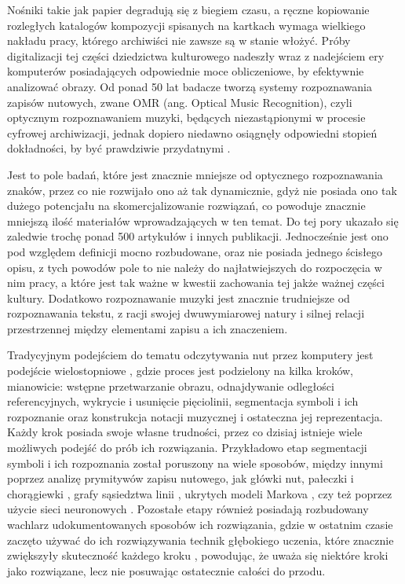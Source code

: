 \documentclass[xodstep]{wnspt}
\begin{document}
Nośniki takie jak papier degradują się z biegiem czasu, a ręczne kopiowanie rozległych katalogów kompozycji spisanych na kartkach wymaga wielkiego nakładu pracy, którego archiwiści nie zawsze są w stanie włożyć. Próby digitalizacji tej części dziedzictwa kulturowego nadeszły wraz z nadejściem ery komputerów posiadających odpowiednie moce obliczeniowe, by efektywnie analizować obrazy. Od ponad 50 lat badacze tworzą systemy rozpoznawania zapisów nutowych, zwane OMR (ang. Optical Music Recognition), czyli optycznym rozpoznawaniem muzyki, będących niezastąpionymi w procesie cyfrowej archiwizacji, jednak dopiero niedawno osiągnęły odpowiedni stopień dokładności, by być prawdziwie przydatnymi \cite{Hajicjr.2018}. 

Jest to pole badań, które jest znacznie mniejsze od optycznego rozpoznawania znaków, przez co nie rozwijało ono aż tak dynamicznie, gdyż nie posiada ono tak dużego potencjału na skomercjalizowanie rozwiązań, co powoduje znacznie mniejszą ilość materiałów wprowadzających w ten temat. Do tej pory ukazało się zaledwie trochę ponad 500 artykułów i innych publikacji. Jednocześnie jest ono pod względem definicji mocno rozbudowane, oraz nie posiada jednego ścisłego opisu, z tych powodów pole to nie należy do najłatwiejszych do rozpoczęcia w nim pracy\cite{Calvo-Zaragoza2020}, a które jest tak ważne w kwestii zachowania tej jakże ważnej części kultury. Dodatkowo rozpoznawanie muzyki jest znacznie trudniejsze od rozpoznawania tekstu, z racji swojej dwuwymiarowej natury i silnej relacji przestrzennej między elementami zapisu a ich znaczeniem.

Tradycyjnym podejściem do tematu odczytywania nut przez komputery jest podejście wielostopniowe \cite{Rebelo2012}, gdzie proces jest podzielony na kilka kroków, mianowicie: wstępne przetwarzanie obrazu, odnajdywanie odległości referencyjnych, wykrycie i usunięcie pięciolinii, segmentacja symboli i ich rozpoznanie oraz konstrukcja notacji muzycznej i ostateczna jej reprezentacja. Każdy krok posiada swoje własne trudności, przez co dzisiaj istnieje wiele możliwych podejść do prób ich rozwiązania. Przykładowo etap segmentacji symboli i ich rozpoznania został poruszony na wiele sposobów, między innymi poprzez analizę prymitywów zapisu nutowego, jak główki nut, pałeczki i chorągiewki \cite{Toyama2006}, grafy sąsiedztwa linii \cite{Reed1996}, ukrytych modeli Markova \cite{Pugin2006}, czy też poprzez użycie sieci neuronowych \cite{Mehta2015}. Pozostałe etapy również posiadają rozbudowany wachlarz udokumentowanych sposobów ich rozwiązania, gdzie w ostatnim czasie zaczęto używać do ich rozwiązywania technik głębokiego uczenia, które znacznie zwiększyły skuteczność każdego kroku \cite{Pacha2017}\cite{Gallego2017}, powodując, że uważa się niektóre kroki jako rozwiązane, lecz nie posuwając ostatecznie całości do przodu.
\end{document}
